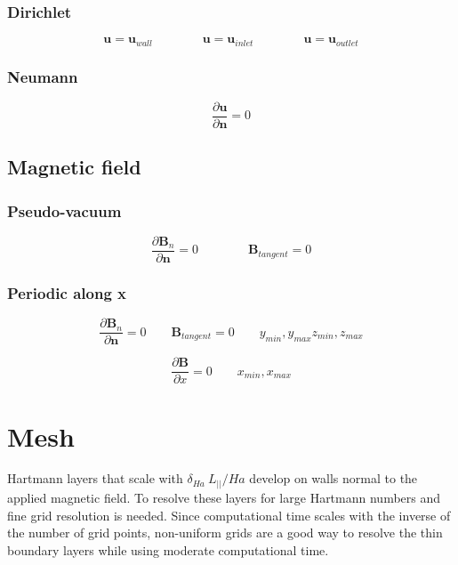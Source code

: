 \documentclass[11pt]{article}
\begin{document}
\subsubsection{Dirichlet}

\begin{equation}
	\pmb{u} = \pmb{u}_{wall}
	\qquad \qquad
	\pmb{u} = \pmb{u}_{inlet}
	\qquad \qquad
	\pmb{u} = \pmb{u}_{outlet}
\end{equation}

\subsubsection{Neumann}
\begin{equation}
	\frac{\partial \pmb{u}}{\partial \pmb{n}} = 0
\end{equation}

\subsection{Magnetic field}
\subsubsection{Pseudo-vacuum}
\begin{equation}
	\frac{\partial \pmb{B}_{n}}{\partial \pmb{n}} = 0
	\qquad \qquad
	\pmb{B}_{tangent} = 0
\end{equation}

\subsubsection{Periodic along x}
\begin{equation}
	\frac{\partial \pmb{B}_{n}}{\partial \pmb{n}} = 0
	\qquad
	\pmb{B}_{tangent} = 0
	\qquad
	y_{min},y_{max}
	z_{min},z_{max}
\end{equation}

\begin{equation}
	\frac{\partial \pmb{B}}{\partial x} = 0
	\qquad
	x_{min},x_{max}
\end{equation}

\section{Mesh}
Hartmann layers that scale with $\delta_{Ha}~L_{||}/Ha$ develop on walls normal to the applied magnetic field. To resolve these layers for large Hartmann numbers and fine grid resolution is needed. Since computational time scales with the inverse of the number of grid points, non-uniform grids are a good way to resolve the thin boundary layers while using moderate computational time.
\end{document}
